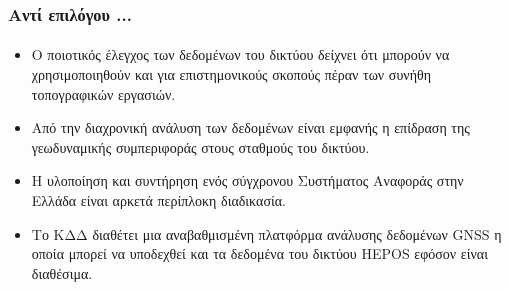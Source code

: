 \begin{frame}
  \frametitle{Αντί επιλόγου ...}
  \framesubtitle{}
  \label{}
  \begin{itemize}\setlength\itemsep{1em}
    \item Ο ποιοτικός έλεγχος των δεδομένων του δικτύου δείχνει ότι μπορούν να χρησιμοποιηθούν και για επιστημονικούς σκοπούς πέραν των συνήθη τοπογραφικών εργασιών.
    \item Από την διαχρονική ανάλυση των δεδομένων είναι εμφανής η επίδραση της γεωδυναμικής συμπεριφοράς στους σταθμούς του δικτύου.
    \item Η υλοποίηση και συντήρηση ενός σύγχρονου Συστήματος Αναφοράς στην Ελλάδα είναι αρκετά περίπλοκη διαδικασία.
    \item Το ΚΔΔ διαθέτει μια αναβαθμισμένη πλατφόρμα ανάλυσης δεδομένων GNSS η οποία  μπορεί να υποδεχθεί και τα δεδομένα του δικτύου HEPOS εφόσον είναι διαθέσιμα.
  \end{itemize}
\end{frame}
\note{}